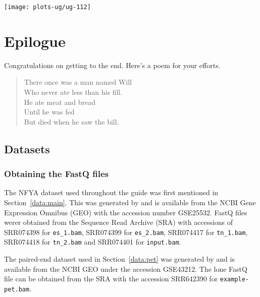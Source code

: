 \documentclass[12pt]{report}
\newcommand{\code}[1]{{\small\texttt{#1}}}
\newenvironment{combox}
{ \begin{shaded}\begin{center}\begin{minipage}[t]{0.95\textwidth} }
{ \end{minipage}\end{center}\end{shaded} }
\begin{document}
\begin{center}
\texttt{[image: plots-ug/ug-112]}
\end{center}



\chapter{Epilogue}

\begin{combox}
Congratulations on getting to the end. Here's a poem for your efforts.
\begin{quote}
There once was a man named Will \\
Who never ate less than his fill. \\
He ate meat and bread \\
Until he was fed \\
But died when he saw the bill. 
\end{quote}
\end{combox}

\section{Datasets}
\label{sec:dataset}

\subsection{Obtaining the FastQ files}
The NFYA dataset used throughout the guide was first mentioned in Section~\ref{data:main}. 
This was generated by \cite{tiwari2012} and is available from the NCBI Gene Expression Omnibus (GEO) with the accession number GSE25532. 
FastQ files werer obtained from the Sequence Read Archive (SRA) with accessions of SRR074398 for \code{es\_1.bam}, SRR074399 for \code{es\_2.bam}, SRR074417 for \code{tn\_1.bam}, SRR074418 for \code{tn\_2.bam} and SRR074401 for \code{input.bam}.

The paired-end dataset used in Section~\ref{data:pet} was generated by \cite{pal2013} and is available from the NCBI GEO under the accession GSE43212.
The lone FastQ file can be obtained from the SRA with the accession SRR642390 for \code{example-pet.bam}.
\end{document}
